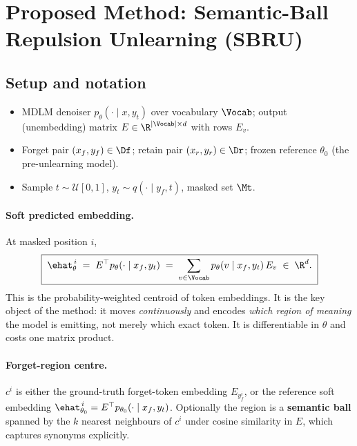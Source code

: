 
\section{Proposed Method: Semantic-Ball Repulsion Unlearning (SBRU)}
\label{sec:method}

\subsection{Setup and notation}

\begin{itemize}
\item MDLM denoiser $p_\theta(\cdot \mid x, y_t)$ over vocabulary $\Vocab$; output (unembedding) matrix
$E \in \R^{|\Vocab| \times d}$ with rows $E_v$.
\item Forget pair $(x_f, y_f) \in \Df$; retain pair $(x_r, y_r) \in \Dr$; frozen reference $\theta_0$
(the pre-unlearning model).
\item Sample $t \sim \mathcal{U}[0,1]$, $y_t \sim q(\cdot \mid y_f, t)$, masked set $\Mt$.
\end{itemize}

\paragraph{Soft predicted embedding.} At masked position $i$,
\begin{equation}
\boxed{\;\ehat_\theta^{\,i} \;=\; E^\top p_\theta(\cdot \mid x_f, y_t)
\;=\; \sum_{v \in \Vocab} p_\theta(v \mid x_f, y_t)\, E_v \;\in\; \R^{d}. \;}
\label{eq:soft-emb}
\end{equation}
This is the probability-weighted centroid of token embeddings. It is the key object of the method: it
moves \emph{continuously} and encodes \emph{which region of meaning} the model is emitting, not merely
which exact token. It is differentiable in $\theta$ and costs one matrix product.

\paragraph{Forget-region centre.} $c^{i}$ is either the ground-truth forget-token embedding
$E_{y_f^{i}}$, or the reference soft embedding $\ehat_{\theta_0}^{\,i} = E^\top p_{\theta_0}(\cdot \mid
x_f, y_t)$. Optionally the region is a \textbf{semantic ball} spanned by the $k$ nearest neighbours of
$c^i$ under cosine similarity in $E$, which captures synonyms explicitly.

